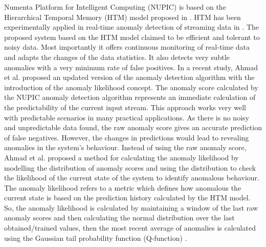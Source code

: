 Numenta Platform for Intelligent Computing (NUPIC) is based on the Hierarchical Temporal Memory (HTM) model proposed in \cite{Hawkins:2007fi}. HTM has been experimentally applied in real-time anomaly detection of streaming data in \cite{DBLP:journals/corr/AhmadP16,DBLP:journals/corr/LavinA15}. The proposed system based on the HTM model claimed to be efficient and tolerant to noisy data. Most importantly it offers continuous monitoring of real-time data and adapts the changes of the data statistics. It also detects very subtle anomalies with a very minimum rate of false positives. In a recent study, Ahmad et al. \cite{AHMAD2017134} proposed an updated version of the anomaly detection algorithm with the introduction of the anomaly likelihood concept. 
The anomaly score calculated by the NUPIC anomaly detection algorithm represents an immediate calculation of the predictability of the current input stream. This approach works very well with predictable scenarios in many practical applications. As there is no noisy and unpredictable data found, the raw anomaly score gives an accurate prediction of false negatives. However, the changes in predictions would lead to revealing anomalies in the system’s behaviour. Instead of using the raw anomaly score, Ahmad et al. \cite{AHMAD2017134} proposed a method for calculating the anomaly likelihood by modelling the distribution of anomaly scores and using the distribution to check the likelihood of the current state of the system to identify anomalous behaviour. The anomaly likelihood refers to a metric which defines how anomalous the current state is based on the prediction history calculated by the HTM model. So, the anomaly likelihood is calculated by maintaining a window of the last raw anomaly scores and then calculating the normal distribution over the last obtained/trained values, then the most recent average of anomalies is calculated using the Gaussian tail probability function (Q-function) \cite{craig1991new}.

